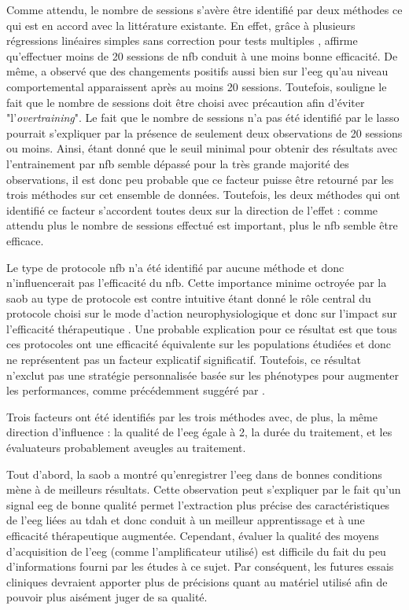 Comme attendu, le nombre de sessions s'avère être identifié par deux méthodes ce qui est en accord avec la littérature existante. En effet, grâce à plusieurs régressions linéaires 
simples sans correction pour tests multiples \citep{Arns2009}, \citet{Arns2014} affirme qu'effectuer moins de 20 sessions de \gls{nfb} conduit à une moins bonne efficacité. De même,
\citet{Vernon2004} a observé que des changements positifs aussi bien sur l'\gls{eeg} qu'au niveau comportemental apparaissent après au moins 20 sessions. Toutefois, \citep{Enriquez2017}
souligne le fait que le nombre de sessions doit être choisi avec précaution afin d'éviter "l'\textit{overtraining}". Le fait que le nombre de sessions n'a pas été identifié par le \gls{lasso}
pourrait s'expliquer par la présence de seulement deux observations de 20 sessions ou moins. Ainsi, étant donné que le seuil minimal pour obtenir des résultats avec l'entrainement
par \gls{nfb} semble dépassé pour la très grande majorité des observations, il est donc peu probable que ce facteur puisse être retourné par les trois méthodes sur cet ensemble de données. 
Toutefois, les deux méthodes qui ont identifié ce facteur s'accordent toutes deux sur la direction de l'effet : comme attendu plus le nombre de sessions effectué est important, 
plus le \gls{nfb} semble être efficace. 

Le type de protocole \gls{nfb} n'a été identifié par aucune méthode et donc n'influencerait pas l'efficacité du \gls{nfb}. Cette importance minime octroyée par la \gls{saob} au type de protocole
est contre intuitive étant donné le rôle central du protocole choisi sur le mode d'action neurophysiologique et donc sur l'impact sur l'efficacité thérapeutique \citep{Vernon2004}. Une probable 
explication pour ce résultat est que tous ces protocoles ont une efficacité équivalente sur les populations étudiées et donc ne représentent pas un facteur explicatif significatif. 
Toutefois, ce résultat n'exclut pas une stratégie personnalisée basée sur les phénotypes pour augmenter les performances, comme précédemment suggéré par \citet{Alkoby2017}.

Trois facteurs ont été identifiés par les trois méthodes avec, de plus, la même direction d'influence : la qualité de l'\gls{eeg} égale à 2, la durée du traitement, et les évaluateurs 
probablement aveugles au traitement. 

Tout d'abord, la \gls{saob} a montré qu'enregistrer l'\gls{eeg} dans de bonnes conditions mène à de meilleurs résultats. Cette observation peut s'expliquer par le fait qu'un signal
\gls{eeg} de bonne qualité permet l'extraction plus précise des caractéristiques de l'\gls{eeg} liées au \gls{tdah} et donc conduit à un meilleur apprentissage et 
à une efficacité thérapeutique augmentée. Cependant, évaluer la qualité des moyens d'acquisition de l'\gls{eeg} (comme l'amplificateur utilisé) 
est difficile du fait du peu d'informations fourni par les études à ce sujet. Par conséquent, les futures essais cliniques devraient apporter plus 
de précisions quant au matériel utilisé afin de pouvoir plus aisément juger de sa qualité. 

